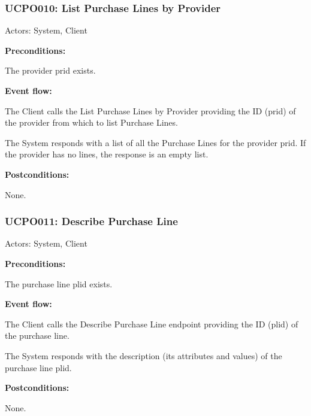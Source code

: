 \begin{ucbox}{\subsubsection{UCPO010: List Purchase Lines by Provider}}
\label{UCPO010}

Actors: System, Client

\textbf{Preconditions:}

\ucitem The provider prid exists.

\textbf{Event flow:}

\ucitem The Client calls the List Purchase Lines by Provider providing the ID (prid) of the provider from which to list Purchase Lines.

\ucitem The System responds with a list of all the Purchase Lines for the provider prid. If the provider has no lines, the response is an empty list.

\textbf{Postconditions:}

\ucitem None.

\end{ucbox}

\begin{ucbox}{\subsubsection{UCPO011: Describe Purchase Line}}
\label{UCPO011}

Actors: System, Client

\textbf{Preconditions:}

\ucitem The purchase line plid exists.

\textbf{Event flow:}

\ucitem The Client calls the Describe Purchase Line endpoint providing the ID (plid) of the purchase line.

\ucitem The System responds with the description (its attributes and values) of the purchase line plid.

\textbf{Postconditions:}

\ucitem None.

\end{ucbox}

